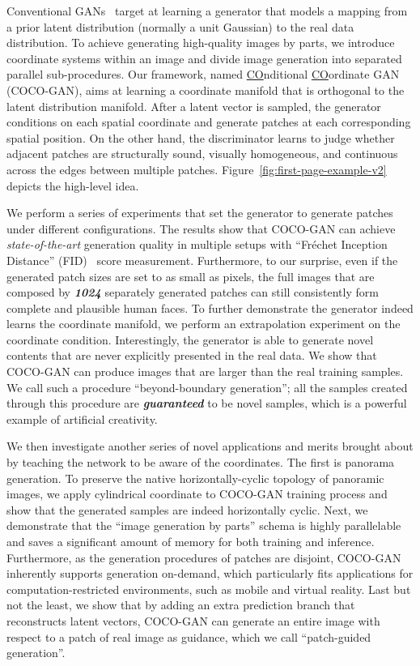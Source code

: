 \documentclass{article}
\newcommand{\modelName}{COCO-GAN }
\begin{document}
Conventional GANs~\cite{GANs} target at learning a generator that models a mapping from a prior latent distribution (normally a unit Gaussian) to the real data distribution. To achieve generating high-quality images by parts, we introduce coordinate systems within an image and divide image generation into separated parallel sub-procedures. Our framework, named \underline{CO}nditional \underline{CO}ordinate GAN (COCO-GAN), aims at learning a coordinate manifold that is orthogonal to the latent distribution manifold. After a latent vector is sampled, the generator conditions on each spatial coordinate and generate patches at each corresponding spatial position. On the other hand, the discriminator learns to judge whether adjacent patches are structurally sound, visually homogeneous, and continuous across the edges between multiple patches. Figure~\ref{fig:first-page-example-v2} depicts the high-level idea.
    


We perform a series of experiments that set the generator to generate patches under different configurations. The results show that \modelName can achieve \emph{state-of-the-art} generation quality in multiple setups with ``Fréchet Inception Distance'' (FID)~\cite{fid} score measurement. Furthermore, to our surprise, even if the generated patch sizes are set to as small as  pixels, the full images that are composed by \textit{\textbf{1024}} separately generated patches can still consistently form complete and plausible human faces. To further demonstrate the generator indeed learns the coordinate manifold, we perform an extrapolation experiment on the coordinate condition. Interestingly, the generator is able to generate novel contents that are never explicitly presented in the real data. We show that \modelName can produce  images that are larger than the  real training samples. We call such a procedure ``beyond-boundary generation''; all the samples created through this procedure are \textbf{\emph{guaranteed}} to be novel samples, which is a powerful example of artificial creativity.
    
We then investigate another series of novel applications and merits brought about by teaching the network to be aware of the coordinates. The first is panorama generation. To preserve the native horizontally-cyclic topology of panoramic images, we apply cylindrical coordinate to \modelName training process and show that the generated samples are indeed horizontally cyclic. Next, we demonstrate that the ``image generation by parts'' schema is highly parallelable and saves a significant amount of memory for both training and inference. Furthermore, as the generation procedures of patches are disjoint, \modelName inherently supports generation on-demand, which particularly fits applications for computation-restricted environments, such as mobile and virtual reality. Last but not the least, we show that by adding an extra prediction branch that reconstructs latent vectors, \modelName can generate an entire image with respect to a patch of real image as guidance, which we call ``patch-guided generation''. 
    
\end{document}
